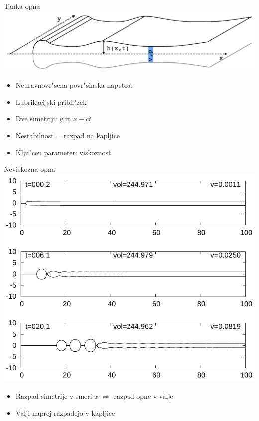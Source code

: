 \documentclass{beamer}
\begin{document}
\begin{frame}{Tanka opna}
 \includegraphics[width=.8\textwidth]{./Slike/mehurcek-skica}
 \begin{itemize}
  \item Neuravnove"sena povr"sinska napetost
  \item Lubrikacijski pribli"zek
  \item Dve simetriji: $y$ in $x-ct$
  \item Nestabilnost = razpad na kapljice
  \item Klju"cen parameter: viskoznost
 \end{itemize}

\end{frame}

\begin{frame}{Neviskozna opna}
 \includegraphics[height=.5\textheight]{./Slike/mehurcek-rezultat-1}
 \begin{itemize}
  \item Razpad simetrije v smeri $x$ $\Rightarrow$ razpad opne v valje
  \item Valji naprej razpadejo v kapljice
 \end{itemize}

\end{frame}
\end{document}
